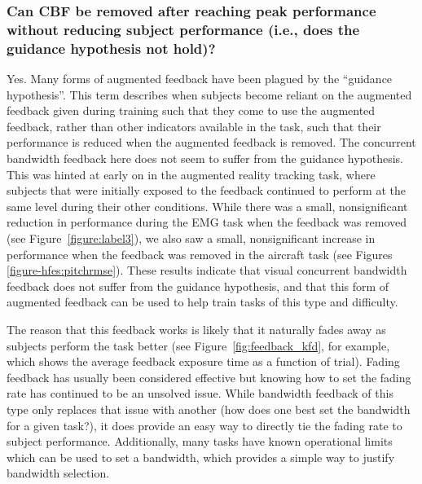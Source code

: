 \subsubsection{Can CBF be removed after reaching peak performance without reducing subject performance (i.e., does the guidance hypothesis not hold)?}
Yes.
Many forms of augmented feedback have been plagued by the ``guidance hypothesis''.
This term describes when subjects become reliant on the augmented feedback given during training such that they come to use the augmented feedback, rather than other indicators available in the task, such that their performance is reduced when the augmented feedback is removed.
The concurrent bandwidth feedback here does not seem to suffer from the guidance hypothesis.
This was hinted at early on in the augmented reality tracking task, where subjects that were initially exposed to the feedback continued to perform at the same level during their other conditions.
While there was a small, nonsignificant reduction in performance during the EMG task when the feedback was removed (see Figure~\ref{figure:label3}), we also saw a small, nonsignificant increase in performance when the feedback was removed in the aircraft task (see Figures \ref{figure-hfes:pitchrmse}).
These results indicate that visual concurrent bandwidth feedback does not suffer from the guidance hypothesis, and that this form of augmented feedback can be used to help train tasks of this type and difficulty.

The reason that this feedback works is likely that it naturally fades away as subjects perform the task better (see Figure~\ref{fig:feedback_kfd}, for example, which shows the average feedback exposure time as a function of trial).
Fading feedback has usually been considered effective but knowing how to set the fading rate has continued to be an unsolved issue.
While bandwidth feedback of this type only replaces that issue with another (how does one best set the bandwidth for a given task?), it does provide an easy way to directly tie the fading rate to subject performance.
Additionally, many tasks have known operational limits which can be used to set a bandwidth, which provides a simple way to justify bandwidth selection.


